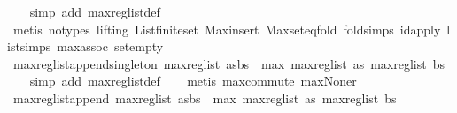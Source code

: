 \begin{isabellebody}
%
\isadelimproof
\ \ %
\endisadelimproof
%
\isatagproof
{}\isamarkupfalse%
\ {\isacharparenleft}simp\ add{\isacharcolon}\ max{\isacharunderscore}reg{\isacharunderscore}list{\isacharunderscore}def{\isacharparenright}\isanewline
\ \ \isamarkupfalse%
\ {\isacharparenleft}metis\ {\isacharparenleft}no{\isacharunderscore}types{\isacharcomma}\ lifting{\isacharparenright}\ List{\isachardot}finite{\isacharunderscore}set\ Max{\isachardot}insert\ Max{\isachardot}set{\isacharunderscore}eq{\isacharunderscore}fold\ fold{\isachardot}simps{\isacharparenleft}{}{\isacharparenright}\ id{\isacharunderscore}apply\ list{\isachardot}simps{\isacharparenleft}{}{}{\isacharparenright}\ max{\isachardot}assoc\ set{\isacharunderscore}empty{\isacharparenright}%
\endisatagproof
{\isafoldproof}%
%
\isadelimproof
\isanewline
%
\endisadelimproof
\isanewline
{}\isamarkupfalse%
\ max{\isacharunderscore}reg{\isacharunderscore}list{\isacharunderscore}append{\isacharunderscore}singleton{\isacharcolon}\ {\isachardoublequoteopen}max{\isacharunderscore}reg{\isacharunderscore}list\ {\isacharparenleft}as{\isacharat}{\isacharbrackleft}bs{\isacharbrackright}{\isacharparenright}\ {\isacharequal}\ max\ {\isacharparenleft}max{\isacharunderscore}reg{\isacharunderscore}list\ as{\isacharparenright}\ {\isacharparenleft}max{\isacharunderscore}reg{\isacharunderscore}list\ {\isacharbrackleft}bs{\isacharbrackright}{\isacharparenright}{\isachardoublequoteclose}\isanewline
%
\isadelimproof
\ \ %
\endisadelimproof
%
\isatagproof
{}\isamarkupfalse%
\ {\isacharparenleft}simp\ add{\isacharcolon}\ max{\isacharunderscore}reg{\isacharunderscore}list{\isacharunderscore}def{\isacharparenright}\isanewline
\ \ \isamarkupfalse%
\ {\isacharparenleft}metis\ max{\isachardot}commute\ max{\isacharunderscore}None{\isacharunderscore}r{\isacharparenright}%
\endisatagproof
{\isafoldproof}%
%
\isadelimproof
\isanewline
%
\endisadelimproof
\isanewline
{}\isamarkupfalse%
\ max{\isacharunderscore}reg{\isacharunderscore}list{\isacharunderscore}append{\isacharcolon}\ {\isachardoublequoteopen}max{\isacharunderscore}reg{\isacharunderscore}list\ {\isacharparenleft}as{\isacharat}bs{\isacharparenright}\ {\isacharequal}\ max\ {\isacharparenleft}max{\isacharunderscore}reg{\isacharunderscore}list\ as{\isacharparenright}\ {\isacharparenleft}max{\isacharunderscore}reg{\isacharunderscore}list\ bs{\isacharparenright}{\isachardoublequoteclose}\isanewline
%
\isadelimproof
%
\endisadelimproof
%
\isatagproof
{}\isamarkupfalse%

\end{isabellebody}
